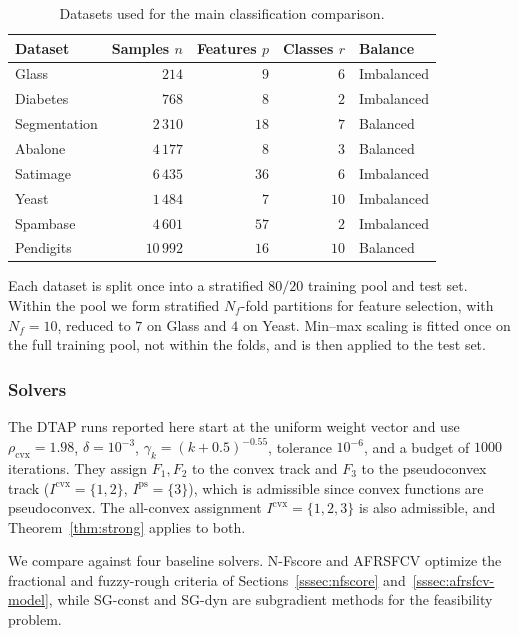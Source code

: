 \documentclass[]{interact}
\theoremstyle{plain}
\theoremstyle{definition}
\theoremstyle{remark}
\newcommand{\cvx}{\mathrm{cvx}}
\newcommand{\ps}{\mathrm{ps}}
\begin{document}
\begin{table}[htbp]
\centering
\caption{Datasets used for the main classification comparison.}\label{tab:datasets}
\begin{tabular}{lrrrl}
\toprule
Dataset      & Samples $n$ & Features $p$ & Classes $r$ & Balance    \\
\midrule
Glass        & $214$       & $9$          & $6$         & Imbalanced \\
Diabetes     & $768$       & $8$          & $2$         & Imbalanced \\
Segmentation & $2\,310$    & $18$         & $7$         & Balanced   \\
Abalone      & $4\,177$    & $8$          & $3$         & Balanced   \\
Satimage     & $6\,435$    & $36$         & $6$         & Imbalanced \\
Yeast        & $1\,484$    & $7$          & $10$        & Imbalanced \\
Spambase     & $4\,601$    & $57$         & $2$         & Imbalanced \\
Pendigits    & $10\,992$   & $16$         & $10$        & Balanced   \\
\bottomrule
\end{tabular}
\end{table}
Each dataset is split once into a stratified $80/20$ training pool and test set. Within the pool we form stratified $N_f$-fold partitions for feature selection, with $N_f=10$, reduced to $7$ on Glass and $4$ on Yeast. Min--max scaling is fitted once on the full training pool, not within the folds, and is then applied to the test set.

\subsubsection{Solvers}\label{sssec:baselines}
The DTAP runs reported here start at the uniform weight vector and use $\rho_{\cvx}=1.98$, $\delta=10^{-3}$, $\gamma_k=(k+0.5)^{-0.55}$, tolerance $10^{-6}$, and a budget of $1000$ iterations. They assign $F_1,F_2$ to the convex track and $F_3$ to the pseudoconvex track ($I^{\cvx}=\{1,2\}$, $I^{\ps}=\{3\}$), which is admissible since convex functions are pseudoconvex. The all-convex assignment $I^{\cvx}=\{1,2,3\}$ is also admissible, and Theorem~\ref{thm:strong} applies to both.

We compare against four baseline solvers. N-Fscore and AFRSFCV optimize the fractional and fuzzy-rough criteria of Sections~\ref{sssec:nfscore} and~\ref{sssec:afrsfcv-model}, while SG-const and SG-dyn are subgradient methods for the feasibility problem.
\end{document}
